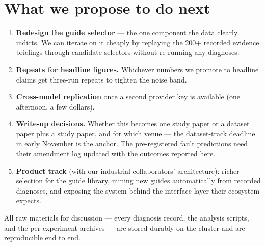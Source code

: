 \section{What we propose to do next}
\label{sec:next}

\begin{enumerate}
  \item \textbf{Redesign the guide selector} --- the one component the data clearly
  indicts. We can iterate on it cheaply by replaying the 200+ recorded evidence
  briefings through candidate selectors without re-running any diagnoses.
  \item \textbf{Repeats for headline figures.} Whichever numbers we promote to
  headline claims get three-run repeats to tighten the noise band.
  \item \textbf{Cross-model replication} once a second provider key is available
  (one afternoon, a few dollars).
  \item \textbf{Write-up decisions.} Whether this becomes one study paper or a
  dataset paper plus a study paper, and for which venue --- the dataset-track
  deadline in early November is the anchor. The pre-registered fault predictions
  need their amendment log updated with the outcomes reported here.
  \item \textbf{Product track} (with our industrial collaborators' architecture):
  richer selection for the guide library, mining new guides automatically from
  recorded diagnoses, and exposing the system behind the interface layer their
  ecosystem expects.
\end{enumerate}

All raw materials for discussion --- every diagnosis record, the analysis scripts,
and the per-experiment archives --- are stored durably on the cluster and are
reproducible end to end.

